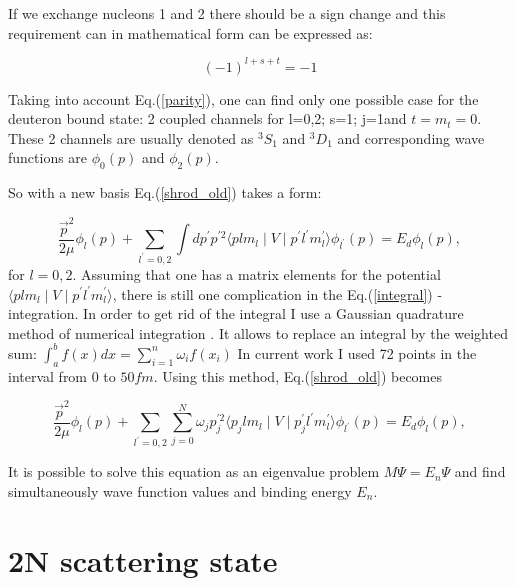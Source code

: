     If we exchange nucleons 1 and 2 there should be a sign change and this requirement 
    can in mathematical form can be expressed as:

    \begin{equation}
        (-1)^{l+s+t} = -1
        \label{parity}
    \end{equation}

    Taking into account Eq.(\ref{parity}), one can find only one possible case for 
    the deuteron bound state: 2 coupled channels for l=0,2; s=1; j=1and $t = m_t = 0$. 
    These 2 channels are usually denoted as $^3S_1$ and $^3D_1$ and
    corresponding wave functions are $\phi_0(p)$ and $\phi_2(p)$. 

    So with a new basis Eq.(\ref{shrod_old}) takes a form:

    \begin{equation}
        \frac{\vec{p}^2}{2\mu} \phi_l(p) +
        \sum_{l^\prime =0,2} \int d p^\prime p^{\prime 2} 
        \langle plm_l \mid V \mid p^\prime l^\prime m_l^\prime  \rangle
        \phi_{l^\prime}(p) = 
        E_d \phi_l(p),
        \label{integral}
    \end{equation}
    for $l=0,2$. Assuming that one has a matrix elements for the potential 
    $\langle plm_l \mid V \mid p^\prime l^\prime m_l^\prime  \rangle$,
    there is still one complication in the Eq.(\ref{integral}) - integration.
    In order to get rid of the integral I use a Gaussian quadrature 
    method of numerical integration \cite{jacobi1826ueber}.
    It allows to replace an integral by the weighted sum:
        $\int_a^b f(x)dx = \sum_{i=1}^n \omega_i f(x_i)$
    In current work I used 72 points in the interval from $0$ to $50 fm$. 
    Using this method, Eq.(\ref{shrod_old}) becomes  

    
    \begin{equation}
        \frac{\vec{p}^2}{2\mu} \phi_l(p) +
        \sum_{l^\prime =0,2}\sum_{j =0}^N  \omega_j p^{\prime 2}_j \langle p_jlm_l \mid V \mid p^\prime_j l^\prime m_l^\prime  \rangle
        \phi_{l^\prime}(p) = 
        E_d \phi_l(p),
        \label{integral2}
    \end{equation}

    It is possible to solve this equation as an eigenvalue problem $M\Psi = E_n \Psi$ and
    find simultaneously wave function values and binding energy $E_n$.

\section{2N scattering state}

